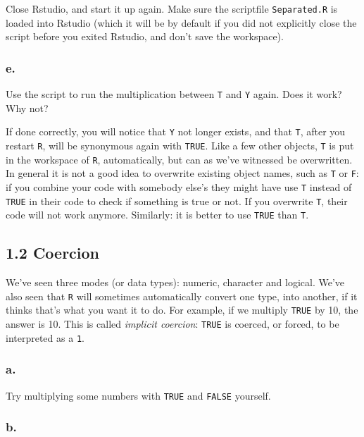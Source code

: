 \documentclass[]{article}
\begin{document}
Close Rstudio, and start it up again. Make sure the scriptfile
\texttt{Separated.R} is loaded into Rstudio (which it will be by default
if you did not explicitly close the script before you exited Rstudio,
and don't save the workspace).

\hypertarget{e.}{%
\subsubsection{e.}\label{e.}}

Use the script to run the multiplication between \texttt{T} and
\texttt{Y} again. Does it work? Why not?

If done correctly, you will notice that \texttt{Y} not longer exists,
and that \texttt{T}, after you restart \texttt{R}, will be synonymous
again with \texttt{TRUE}. Like a few other objects, \texttt{T} is put in
the workspace of \texttt{R}, automatically, but can as we've witnessed
be overwritten. In general it is not a good idea to overwrite existing
object names, such as \texttt{T} or \texttt{F}: if you combine your code
with somebody else's they might have use \texttt{T} instead of
\texttt{TRUE} in their code to check if something is true or not. If you
overwrite \texttt{T}, their code will not work anymore. Similarly: it is
better to use \texttt{TRUE} than \texttt{T}.

\hypertarget{coercion}{%
\subsection{1.2 Coercion}\label{coercion}}

We've seen three modes (or data types): numeric, character and logical.
We've also seen that \texttt{R} will sometimes automatically convert one
type, into another, if it thinks that's what you want it to do. For
example, if we multiply \texttt{TRUE} by 10, the answer is 10. This is
called \emph{implicit coercion}: \texttt{TRUE} is coerced, or forced, to
be interpreted as a \texttt{1}.

\hypertarget{a.-1}{%
\subsubsection{a.}\label{a.-1}}

Try multiplying some numbers with \texttt{TRUE} and \texttt{FALSE}
yourself.

\hypertarget{b.-1}{%
\subsubsection{b.}\label{b.-1}}
\end{document}
